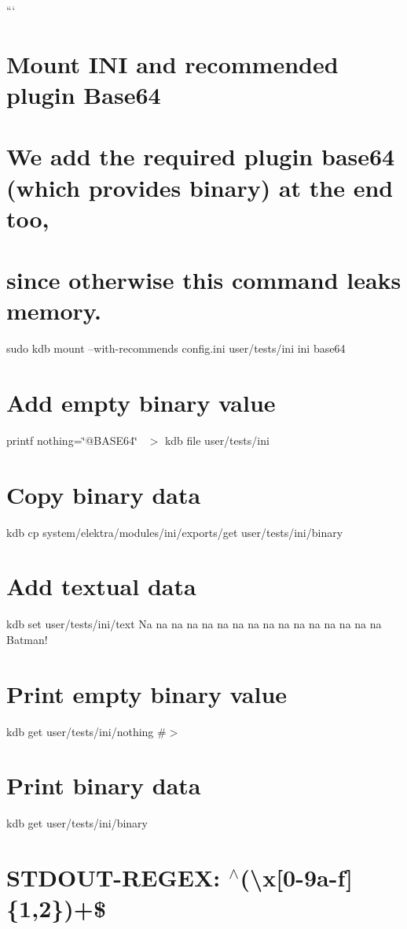 ``` \section*{Mount I\+NI and recommended plugin Base64}

\section*{We add the required plugin {\ttfamily base64} (which provides {\ttfamily binary}) at the end too,}

\section*{since otherwise this command leaks memory.}

sudo kdb mount --with-\/recommends config.\+ini user/tests/ini ini base64

\section*{Add empty binary value}

printf \textquotesingle{}nothing=\char`\"{}@\+B\+A\+S\+E64\char`\"{}~\newline
\textquotesingle{} $>$ {\ttfamily kdb file user/tests/ini} \section*{Copy binary data}

kdb cp system/elektra/modules/ini/exports/get user/tests/ini/binary \section*{Add textual data}

kdb set user/tests/ini/text \textquotesingle{}Na na na na na na na na na na na na na na na na Batman!\textquotesingle{}

\section*{Print empty binary value}

kdb get user/tests/ini/nothing \#$>$

\section*{Print binary data}

kdb get user/tests/ini/binary \section*{S\+T\+D\+O\+U\+T-\/\+R\+E\+G\+EX\+: $^\wedge$(\textbackslash{}x\mbox{[}0-\/9a-\/f\mbox{]}\{1,2\})+\$}

